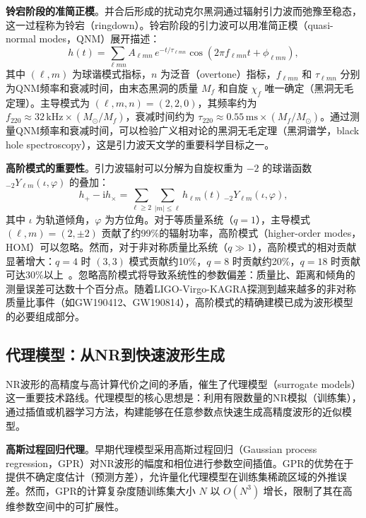 \textbf{铃宕阶段的准简正模}。并合后形成的扰动克尔黑洞通过辐射引力波而弛豫至稳态，这一过程称为铃宕（ringdown）。铃宕阶段的引力波可以用准简正模（quasi-normal modes，QNM）展开描述：
\begin{equation}
  h(t) = \sum_{\ell m n} A_{\ell m n} \, e^{-t/\tau_{\ell m n}} \cos\!\left(2\pi f_{\ell m n} t + \phi_{\ell m n}\right),
\end{equation}
其中 $(\ell, m)$ 为球谐模式指标，$n$ 为泛音（overtone）指标，$f_{\ell m n}$ 和 $\tau_{\ell m n}$ 分别为QNM频率和衰减时间，由末态黑洞的质量 $M_f$ 和自旋 $\chi_f$ 唯一确定（黑洞无毛定理）。主导模式为 $(\ell, m, n) = (2, 2, 0)$，其频率约为 $f_{220} \approx 32\,\mathrm{kHz} \times (M_\odot/M_f)$，衰减时间约为 $\tau_{220} \approx 0.55\,\mathrm{ms} \times (M_f/M_\odot)$。通过测量QNM频率和衰减时间，可以检验广义相对论的黑洞无毛定理（黑洞谱学，black hole spectroscopy），这是引力波天文学的重要科学目标之一。

\textbf{高阶模式的重要性}。引力波辐射可以分解为自旋权重为 $-2$ 的球谐函数 ${}_{-2}Y_{\ell m}(\iota, \varphi)$ 的叠加：
\begin{equation}
  h_+ - \mathrm{i} h_\times = \sum_{\ell \geq 2} \sum_{|m| \leq \ell} h_{\ell m}(t) \, {}_{-2}Y_{\ell m}(\iota, \varphi),
\end{equation}
其中 $\iota$ 为轨道倾角，$\varphi$ 为方位角。对于等质量系统（$q = 1$），主导模式 $(\ell, m) = (2, \pm 2)$ 贡献了约99\%的辐射功率，高阶模式（higher-order modes，HOM）可以忽略。然而，对于非对称质量比系统（$q \gg 1$），高阶模式的相对贡献显著增大：$q = 4$ 时 $(3,3)$ 模式贡献约10\%，$q = 8$ 时贡献约20\%，$q = 18$ 时贡献可达30\%以上~\cite{Cotesta2018HOM}。忽略高阶模式将导致系统性的参数偏差：质量比、距离和倾角的测量误差可达数十个百分点。随着LIGO-Virgo-KAGRA探测到越来越多的非对称质量比事件（如GW190412、GW190814），高阶模式的精确建模已成为波形模型的必要组成部分。

\subsection{代理模型：从NR到快速波形生成}

NR波形的高精度与高计算代价之间的矛盾，催生了代理模型（surrogate models）这一重要技术路线。代理模型的核心思想是：利用有限数量的NR模拟（训练集），通过插值或机器学习方法，构建能够在任意参数点快速生成高精度波形的近似模型。

\textbf{高斯过程回归代理}。早期代理模型采用高斯过程回归（Gaussian process regression，GPR）对NR波形的幅度和相位进行参数空间插值。GPR的优势在于提供不确定度估计（预测方差），允许量化代理模型在训练集稀疏区域的外推误差。然而，GPR的计算复杂度随训练集大小 $N$ 以 $O(N^3)$ 增长，限制了其在高维参数空间中的可扩展性。

